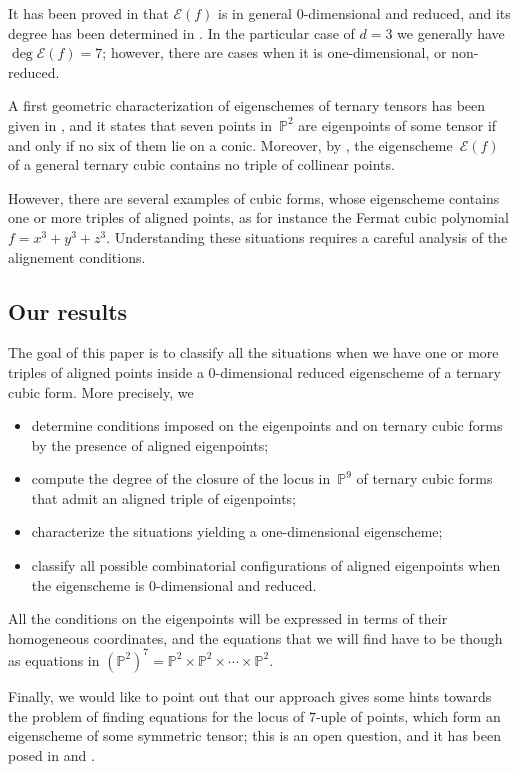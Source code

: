 \documentclass[a4paper, 11pt, reqno]{amsart}
\theoremstyle{plain}
\theoremstyle{definition}
\newcommand{\p}{\mathbb{P}}
\newcommand{\Eig}[1]{\mathcal{E}\!\left( {#1} \right)}
\begin{document}
It has been proved in \cite[Corollary 5.8]{Abo} that $\Eig{f}$ is in general $0$-dimensional and reduced,
and its degree has been determined in \cite[Theorem 2.1]{CartSturm}.
In the particular case of $d=3$ we generally have
$\deg \Eig{f}=7$; however,
 there are cases when it is one-dimensional, or non-reduced.

A first geometric characterization of eigenschemes of ternary tensors has been given in
\cite[Theorem 5.1]{ASS}, and it states that seven points in~$\p^2$ are eigenpoints of some tensor if and only if no six of them lie on a conic.
Moreover, by \cite[Theorem 5.7]{BGV},
the eigenscheme~$\Eig{f}$ of a general ternary cubic contains no triple of collinear points.

However, there are several examples of cubic forms, whose eigenscheme contains one or more triples of aligned points,
as for instance the Fermat cubic polynomial $f=x^3+y^3+z^3$.
Understanding these situations requires a careful analysis of the alignement conditions.

\subsection*{Our results}
The goal of this paper is to classify all the situations when we have one or more triples of aligned points inside a $0$-dimensional reduced eigenscheme of a ternary cubic form.
More precisely, we
%
\begin{itemize}
    \item determine conditions imposed on the eigenpoints and on ternary cubic forms by the presence of aligned eigenpoints;
    \item compute the degree of the closure of the locus in~$\p^9$ of ternary cubic forms that admit an aligned triple of eigenpoints;
    \item characterize the situations yielding a one-dimensional eigenscheme;
    \item classify all possible combinatorial configurations of aligned eigenpoints when the eigenscheme is $0$-dimensional and reduced.
\end{itemize}
%
All the conditions on the eigenpoints will be expressed in terms of their homogeneous coordinates, and the equations that we will find have to be though as equations in $(\p^2)^7=\p^2 \times \p^2 \times \dotsb \times \p^2$.

Finally, we would like to point out that our approach gives some hints towards the problem of finding equations for the locus of $7$-uple of points, which form an eigenscheme of some symmetric tensor; this is an open question, and it has been posed in \cite{ASS} and \cite{Ottaviani24}.
\end{document}
